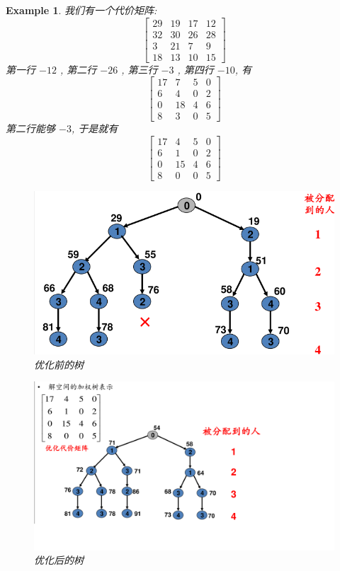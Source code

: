 \documentclass[a4paper, 10pt]{ctexart} %
\newtheorem{example}{Example}
\begin{document}
\begin{example}
我们有一个代价矩阵:
\[
\begin{bmatrix}
    29 & 19 & 17 & 12 \\
    32 & 30 & 26 & 28 \\
    3 & 21 & 7 & 9\\
    18 & 13 & 10 & 15
\end{bmatrix}
\]
第一行 $-12$ , 第二行 $-26$ , 第三行 $-3$ , 第四行 $-10$, 有 
\[
\begin{bmatrix}
    17 &  7 & 5 & 0 \\ 
    6 & 4 & 0 & 2 \\
    0 & 18 & 4 & 6 \\
    8 & 3 & 0 & 5
\end{bmatrix}
\]
第二行能够 $-3$, 于是就有 
\[
\begin{bmatrix}
    17 & 4 & 5 &  0 \\ 
    6 & 1 & 0 & 2 \\
    0 & 15 & 4 & 6\\
    8 & 0 & 0 & 5
\end{bmatrix}
\]
\begin{figure}
    \centering
    \includegraphics[scale = 0.5]{ss3.png}
    \caption{优化前的树}
    \label{fig:tu8}
\end{figure}
\begin{figure}
    \centering
    \includegraphics[scale =0.5]{ss4.png}
    \caption{优化后的树}
    \label{fig:tu9}
\end{figure}


\end{example}
\end{document}
